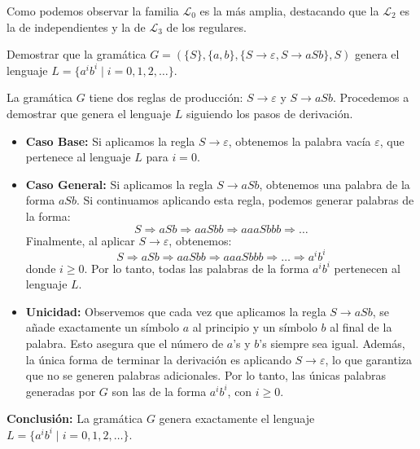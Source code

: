 \documentclass[12pt]{report} %
\begin{document}
Como podemos observar la familia \(\mathcal{L}_0\) es la más amplia,
destacando que la \(\mathcal{L}_2\) es la de independientes y la de
\(\mathcal{L}_3\) de los regulares.

\begin{ejercicioresuelto}
Demostrar que la gramática \( G = (\{S\}, \{a, b\}, \{S \to \varepsilon, S \to aSb\}, S) \) genera el lenguaje \( L = \{a^i b^i \mid i = 0, 1, 2, \ldots\} \).

\begin{demostracion}
La gramática \( G \) tiene dos reglas de producción: \( S \to \varepsilon \) y \( S \to aSb \). Procedemos a demostrar que genera el lenguaje \( L \) siguiendo los pasos de derivación.

\begin{itemize}
    \item \textbf{Caso Base:}  
    Si aplicamos la regla \( S \to \varepsilon \), obtenemos la palabra vacía \( \varepsilon \), que pertenece al lenguaje \( L \) para \( i = 0 \).

    \item \textbf{Caso General:}  
    Si aplicamos la regla \( S \to aSb \), obtenemos una palabra de la forma \( aSb \). Si continuamos aplicando esta regla, podemos generar palabras de la forma:
    \[
    S \Rightarrow aSb \Rightarrow aaSbb \Rightarrow aaaSbbb \Rightarrow \ldots
    \]
    Finalmente, al aplicar \( S \to \varepsilon \), obtenemos:
    \[
    S \Rightarrow aSb \Rightarrow aaSbb \Rightarrow aaaSbbb \Rightarrow \ldots \Rightarrow a^i b^i
    \]
    donde \( i \geq 0 \). Por lo tanto, todas las palabras de la forma \( a^i b^i \) pertenecen al lenguaje \( L \).

    \item \textbf{Unicidad:}  
    Observemos que cada vez que aplicamos la regla \( S \to aSb \), se añade exactamente un símbolo \( a \) al principio y un símbolo \( b \) al final de la palabra. Esto asegura que el número de \( a \)'s y \( b \)'s siempre sea igual. Además, la única forma de terminar la derivación es aplicando \( S \to \varepsilon \), lo que garantiza que no se generen palabras adicionales. Por lo tanto, las únicas palabras generadas por \( G \) son las de la forma \( a^i b^i \), con \( i \geq 0 \).
\end{itemize}

\textbf{Conclusión:} La gramática \( G \) genera exactamente el lenguaje \( L = \{a^i b^i \mid i = 0, 1, 2, \ldots\} \).
\end{demostracion}
\end{ejercicioresuelto}
\end{document}
